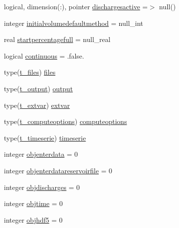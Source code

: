 \begin{DoxyCompactItemize}
logical, dimension(\+:), pointer \mbox{\hyperlink{structmodulereservoirs_1_1t__reservoirs_ab1f1e75685938394a55e292602c2220b}{dischargesactive}} =$>$ null()
\item 
integer \mbox{\hyperlink{structmodulereservoirs_1_1t__reservoirs_a79d0493c083702e8a80e47237c314ba4}{initialvolumedefaultmethod}} = null\+\_\+int
\item 
real \mbox{\hyperlink{structmodulereservoirs_1_1t__reservoirs_ae939837941f5c9646605b6c4d4dd88fe}{startpercentagefull}} = null\+\_\+real
\item 
logical \mbox{\hyperlink{structmodulereservoirs_1_1t__reservoirs_a3b5e7ac09632dc7b6bf5b29d35410fef}{continuous}} = .false.
\item 
type(\mbox{\hyperlink{structmodulereservoirs_1_1t__files}{t\+\_\+files}}) \mbox{\hyperlink{structmodulereservoirs_1_1t__reservoirs_a8b6f5d0c9232aaeac02f63eadb1066d6}{files}}
\item 
type(\mbox{\hyperlink{structmodulereservoirs_1_1t__output}{t\+\_\+output}}) \mbox{\hyperlink{structmodulereservoirs_1_1t__reservoirs_ac5b03cbcae55a64c8b652922c46d86bf}{output}}
\item 
type(\mbox{\hyperlink{structmodulereservoirs_1_1t__extvar}{t\+\_\+extvar}}) \mbox{\hyperlink{structmodulereservoirs_1_1t__reservoirs_a923dec496effec9c757d69c36ff7da97}{extvar}}
\item 
type(\mbox{\hyperlink{structmodulereservoirs_1_1t__computeoptions}{t\+\_\+computeoptions}}) \mbox{\hyperlink{structmodulereservoirs_1_1t__reservoirs_a603fba732ed19161730c80e8a99e91c9}{computeoptions}}
\item 
type(\mbox{\hyperlink{structmodulereservoirs_1_1t__timeserie}{t\+\_\+timeserie}}) \mbox{\hyperlink{structmodulereservoirs_1_1t__reservoirs_a5034713ec23d550e4ed90d8cb8b2e17c}{timeserie}}
\item 
integer \mbox{\hyperlink{structmodulereservoirs_1_1t__reservoirs_a445af3533bea0cf22a0a97446ea02ca2}{objenterdata}} = 0
\item 
integer \mbox{\hyperlink{structmodulereservoirs_1_1t__reservoirs_ae6646d3b3be60b0d0ecca192e875a8e2}{objenterdatareservoirfile}} = 0
\item 
integer \mbox{\hyperlink{structmodulereservoirs_1_1t__reservoirs_aa207b9f1f9a33ada1df6126f9e6525ae}{objdischarges}} = 0
\item 
integer \mbox{\hyperlink{structmodulereservoirs_1_1t__reservoirs_a634c00b77761a0134d5196dff58b18b9}{objtime}} = 0
\item 
integer \mbox{\hyperlink{structmodulereservoirs_1_1t__reservoirs_a0f6aae81371014da3d96c75569911130}{objhdf5}} = 0

\end{DoxyCompactItemize}
